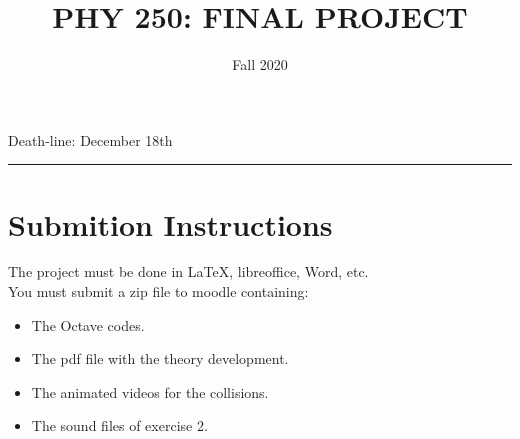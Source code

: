 \documentclass[12pt]{article}
\title{PHY 250: FINAL PROJECT}
\author{Fall 2020}
\date{}
\newcommand{\blankline}{\quad\pagebreak[2]}
\begin{document}
\maketitle








\begin{center}
Death-line: December  18th    
\end{center}
\hrule






\section*{Submition Instructions}

The project must be done in LaTeX, libreoffice, Word, etc.
\vspace{3mm}
\\
You must submit a zip file to moodle containing:
\vspace{3mm}

\begin{itemize}
\item The Octave codes.
\item The pdf file with the theory development.
\item The animated videos for the collisions.
\item The sound files of exercise 2.
\end{itemize}
\end{document}
